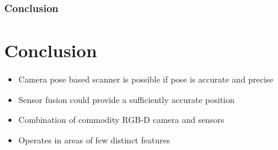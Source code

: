 \documentclass[10pt,serif,t]{beamer}
\newenvironment{Slide}[1]
{
  \begin{frame}[fragile,environment=Slide]
    \frametitle{#1}
    \section{#1}
  }
  {
  \end{frame}
}
\begin{document}
\begin{Slide}{Conclusion}
  \begin{itemize}
    \item
      Camera pose based scanner is possible if pose is accurate and precise

    \item
      Sensor fusion could provide a sufficiently accurate position

    \item
      Combination of commodity RGB-D camera and sensors

    \item
      Operates in areas of few distinct features

  \end{itemize}
\end{Slide}
\end{document}

